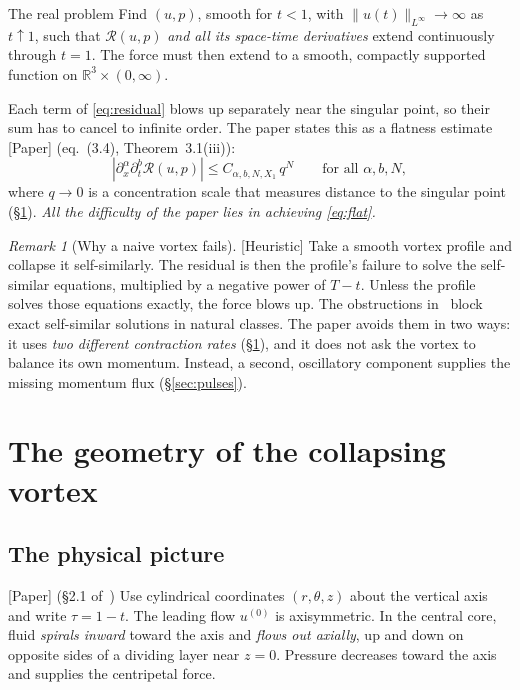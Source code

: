 \documentclass[11pt]{article}
\newcommand{\R}{\mathbb{R}}
\newcommand{\Res}{\mathcal{R}}
\theoremstyle{plain}
\theoremstyle{remark}
\newtheorem{remark}{Remark}
\newcommand{\paper}{\textsf{\small[Paper]}}
\newcommand{\heur}{\textsf{\small[Heuristic]}}
\begin{document}
\begin{keybox}{The real problem}
Find $(u,p)$, smooth for $t<1$, with $\|u(t)\|_{L^\infty}\to\infty$ as $t\uparrow1$, such that $\Res(u,p)$ \emph{and all its space-time derivatives} extend continuously through $t=1$. The force must then extend to a smooth, compactly supported function on $\R^3\times(0,\infty)$.
\end{keybox}

Each term of \eqref{eq:residual} blows up separately near the singular point, so their sum has to cancel to infinite order. The paper states this as a flatness estimate \paper{} (eq.~(3.4), Theorem~3.1(iii)):
\begin{equation}\label{eq:flat}
|\partial_x^\alpha\partial_t^b\Res(u,p)|\le C_{\alpha,b,N,X_1}\,q^N\qquad\text{for all }\alpha,b,N,
\end{equation}
where $q\to0$ is a concentration scale that measures distance to the singular point (\S\ref{sec:geometry}). \emph{All the difficulty of the paper lies in achieving \eqref{eq:flat}.}

\begin{remark}[Why a naive vortex fails]
\heur{} Take a smooth vortex profile and collapse it self-similarly. The residual is then the profile's failure to solve the self-similar equations, multiplied by a negative power of $T-t$. Unless the profile solves those equations exactly, the force blows up. The obstructions in~\cite{NRS,Tsai} block exact self-similar solutions in natural classes. The paper avoids them in two ways: it uses \emph{two different contraction rates} (\S\ref{sec:geometry}), and it does not ask the vortex to balance its own momentum. Instead, a second, oscillatory component supplies the missing momentum flux (\S\ref{sec:pulses}).
\end{remark}

\section{The geometry of the collapsing vortex}\label{sec:geometry}

\subsection{The physical picture}
\paper{} (\S2.1 of~\cite{OAI}) Use cylindrical coordinates $(r,\theta,z)$ about the vertical axis and write $\tau=1-t$. The leading flow $u^{(0)}$ is axisymmetric. In the central core, fluid \emph{spirals inward} toward the axis and \emph{flows out axially}, up and down on opposite sides of a dividing layer near $z=0$. Pressure decreases toward the axis and supplies the centripetal force.
\end{document}
